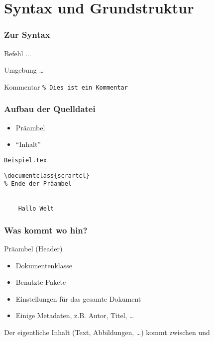 \section{Syntax und Grundstruktur}

\begin{frame}[fragile]
    \frametitle{Zur Syntax}
    \begin{block}{Befehl}
        ...
    \end{block}
    \pause
    \begin{block}{Umgebung}
         \ldots {}
    \end{block}
    \pause
    \begin{block}{Kommentar}
        \verb+% Dies ist ein Kommentar+
    \end{block}
\end{frame}


\begin{frame}[fragile]
    \frametitle{Aufbau der Quelldatei}
    \begin{itemize}
        \item Präambel
        \item \enquote{Inhalt}
    \end{itemize}
    \bigskip
    \pause
    
    \begin{block}{\texttt{Beispiel.tex}}
\begin{verbatim}
\documentclass{scrartcl}
% Ende der Präambel


    Hallo Welt

\end{verbatim}
    \end{block}
\end{frame}


\begin{frame}[fragile]
    \frametitle{Was kommt wo hin?}
    Präambel (Header)
    \begin{itemize}
        \item Dokumentenklasse
        \item Benutzte Pakete
        \item Einstellungen für das gesamte Dokument
        \item Einige Metadaten, z.B. Autor, Titel, \ldots
    \end{itemize}
    \bigskip

    Der eigentliche Inhalt (Text, Abbildungen, \ldots) kommt zwischen \verb++ und \verb++
\end{frame}


